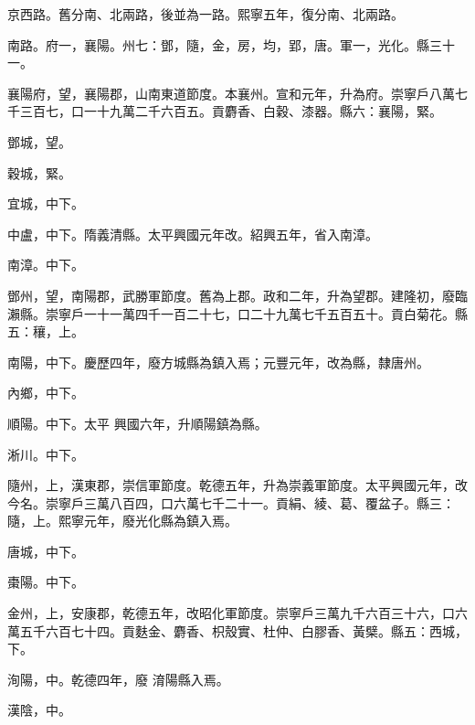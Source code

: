 \begin{pinyinscope}
 京西路。舊分南、北兩路，後並為一路。熙寧五年，復分南、北兩路。



 南路。府一，襄陽。州七：鄧，隨，金，房，均，郢，唐。軍一，光化。縣三十一。



 襄陽府，望，襄陽郡，山南東道節度。本襄州。宣和元年，升為府。崇寧戶八萬七千三百七，口一十九萬二千六百五。貢麝香、白穀、漆器。縣六：襄陽，緊。



 鄧城，望。



 穀城，緊。



 宜城，中下。



 中盧，中下。隋義清縣。太平興國元年改。紹興五年，省入南漳。



 南漳。中下。



 鄧州，望，南陽郡，武勝軍節度。舊為上郡。政和二年，升為望郡。建隆初，廢臨瀨縣。崇寧戶一十一萬四千一百二十七，口二十九萬七千五百五十。貢白菊花。縣五：穰，上。



 南陽，中下。慶歷四年，廢方城縣為鎮入焉；元豐元年，改為縣，隸唐州。



 內鄉，中下。



 順陽。中下。太平
 興國六年，升順陽鎮為縣。



 淅川。中下。



 隨州，上，漢東郡，崇信軍節度。乾德五年，升為崇義軍節度。太平興國元年，改今名。崇寧戶三萬八百四，口六萬七千二十一。貢絹、綾、葛、覆盆子。縣三：隨，上。熙寧元年，廢光化縣為鎮入焉。



 唐城，中下。



 棗陽。中下。



 金州，上，安康郡，乾德五年，改昭化軍節度。崇寧戶三萬九千六百三十六，口六萬五千六百七十四。貢麩金、麝香、枳殼實、杜仲、白膠香、黃檗。縣五：西城，下。



 洵陽，中。乾德四年，廢
 淯陽縣入焉。



 漢陰，中。




\end{pinyinscope}
